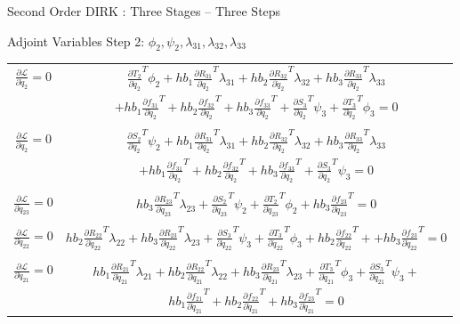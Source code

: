 \documentclass{beamer}
\newcommand{\pd}[2]{\frac{\partial #1}{\partial #2}}
\begin{document}
\begin{frame}[allowframebreaks]{Second Order DIRK : Three Stages -- Three Steps}
  \begin{block}{Adjoint Variables Step 2: $\phi_2,\psi_2,\lambda_{31},\lambda_{32},\lambda_{33}$}
    \begin{table}[h]
    \centering
    \label{adjoint_step2}
    \begin{tabular}{c|c}
      $\pd{{\mathcal L}}{\dot{q}_{2}}   = 0$ & $\pd{{T_2}}{\dot{q}_{2}}^T \phi_2 + h b_1 \pd{R_{31}}{\dot{q}_2}^T\lambda_{31} +  hb_2 \pd{R_{32}}{\dot{q}_2}^T \lambda_{32}  +  hb_3 \pd{R_{33}}{\dot{q}_2}^T \lambda_{33}$ \\
      & $ + h b_1 \pd{f_{31}}{\dot{q}_2}^T + h b_2 \pd{f_{32}}{\dot{q}_2}^T + h b_3 \pd{f_{33}}{\dot{q}_2}^T + \pd{S_3}{\dot{q}_2}^T \psi_3 + \pd{T_3}{\dot{q}_2}^T \phi_3 = 0$  \\
      &\\
      $\pd{{\mathcal L}}{{q}_{2}}       = 0$ & $\pd{S_2}{q_2}^T \psi_2 + hb_1\pd{R_{31}}{q_2}^T\lambda_{31} + hb_2\pd{R_{32}}{q_2}^T \lambda_{32} + hb_3\pd{R_{33}}{q_2}^T \lambda_{33}$\\ 
      &$  + hb_1\pd{f_{31}}{q_2}^T + hb_2\pd{f_{32}}{q_2}^T + hb_3\pd{f_{33}}{q_2}^T + \pd{S_3}{q_2}^T \psi_3  = 0$ \\
      &\\
      $\pd{{\mathcal L}}{\ddot{q}_{23}} = 0$ & $hb_3\pd{R_{23}}{\ddot{q}_{23}}^T\lambda_{23} + \pd{S_2}{\ddot{q}_{23}}^T \psi_2 + \pd{T_2}{\ddot{q}_{23}}^T \phi_2 + hb_3\pd{f_{23}}{\ddot{q}_{23}}^T = 0$ \\
      &\\
      $\pd{{\mathcal L}}{\ddot{q}_{22}} = 0$ & $hb_2\pd{R_{22}}{\ddot{q}_{22}}^T\lambda_{22} + hb_3\pd{R_{23}}{\ddot{q}_{22}}^T\lambda_{23} + \pd{S_3}{\ddot{q}_{22}}^T \psi_3 + \pd{T_3}{\ddot{q}_{22}}^T \phi_3 + hb_2\pd{f_{22}}{\ddot{q}_{22}}^T + + hb_3\pd{f_{23}}{\ddot{q}_{22}}^T= 0$ \\
      &\\
      $\pd{{\mathcal L}}{\ddot{q}_{21}} = 0$ & $hb_1 \pd{R_{21}}{\ddot{q}_{21}}^T \lambda_{21} +  h b_2 \pd{R_{22}}{\ddot{q}_{21}}^T \lambda_{22} + h b_3 \pd{R_{23}}{\ddot{q}_{21}}^T \lambda_{23}  + \pd{T_3}{\ddot{q}_{21}}^T \phi_3 + \pd{S_3}{\ddot{q}_{21}}^T \psi_3 + $ \\ 
      & $ h b_1 \pd{f_{21}}{\ddot{q}_{21}}^T +  h b_2 \pd{f_{22}}{\ddot{q}_{21}}^T +  h b_3 \pd{f_{23}}{\ddot{q}_{21}}^T = 0  $ \\
    \end{tabular}
  \end{table}
\end{block}


\end{frame}
\end{document}
